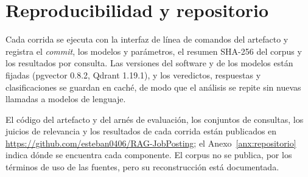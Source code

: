 \section{Reproducibilidad y repositorio}
\label{sec:met-reproducibilidad}

Cada corrida se ejecuta con la interfaz de línea de comandos del artefacto y registra el \textit{commit}, los modelos y parámetros, el resumen SHA-256 del corpus y los resultados por consulta. Las versiones del software y de los modelos están fijadas (pgvector 0.8.2, Qdrant 1.19.1), y los veredictos, respuestas y clasificaciones se guardan en caché, de modo que el análisis se repite sin nuevas llamadas a modelos de lenguaje.

El código del artefacto y del arnés de evaluación, los conjuntos de consultas, los juicios de relevancia y los resultados de cada corrida están publicados en \url{https://github.com/esteban0406/RAG-JobPosting}; el Anexo~\ref{anx:repositorio} indica dónde se encuentra cada componente. El corpus no se publica, por los términos de uso de las fuentes, pero su reconstrucción está documentada.
